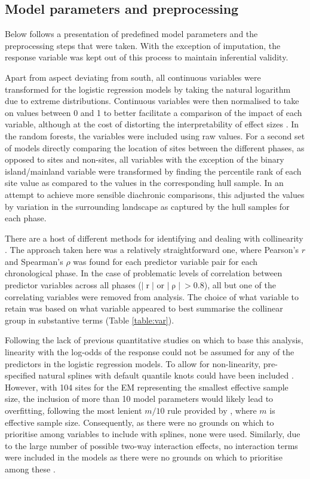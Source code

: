 \documentclass[12pt, a4paper]{article}
\begin{document}
\subsection{Model parameters and preprocessing}
Below follows a presentation of predefined model parameters and the preprocessing steps that were taken. With the exception of imputation, the response variable was kept out of this process to maintain inferential validity.\par
Apart from aspect deviating from south, all continuous variables were transformed for the logistic regression models by taking the natural logarithm due to extreme distributions. Continuous variables were then normalised to take on values between 0 and 1 to better facilitate a comparison of the impact of each variable, although at the cost of distorting the interpretability of effect sizes \citep[cf.][]{spencer2018}. In the random forests, the variables were included using raw values. For a second set of models directly comparing the location of sites between the different phases, as opposed to sites and non-sites, all variables with the exception of the binary island/mainland variable were transformed by finding the percentile rank of each site value as compared to the values in the corresponding hull sample. In an attempt to achieve more sensible diachronic comparisons, this adjusted the values by variation in the surrounding landscape as captured by the hull samples for each phase.\par
There are a host of different methods for identifying and dealing with collinearity \citep[e.g.][]{dormann2012, tomaschek2018}. The approach taken here was a relatively straightforward one, where Pearson's $r$ and Spearman's $\rho$ was found for each predictor variable pair for each chronological phase. In the case of problematic levels of correlation between predictor variables across all phases ($ |\mathopen r \mathclose|$ or $ | \mathopen \rho \mathclose|  \: > 0.8 $), all but one of the correlating variables were removed from analysis. The choice of what variable to retain was based on what variable appeared to best summarise the collinear group in substantive terms (Table \ref{table:var}).\par 
Following the lack of previous quantitative studies on which to base this analysis, linearity with the log-odds of the response could not be assumed for any of the predictors in the logistic regression models. To allow for non-linearity, pre-specified natural splines with default quantile knots could have been included \cite[][26--28]{harrell2015}. However, with 104 sites for the EM representing the smallest effective sample size, the inclusion of more than 10 model parameters would likely lead to overfitting, following the most lenient $m/10$ rule provided by \citet[][72--73]{harrell2015}, where $m$ is effective sample size. Consequently, as there were no grounds on which to prioritise among variables to include with splines, none were used. Similarly, due to the large number of possible two-way interaction effects, no interaction terms were included in the models as there were no grounds on which to prioritise among these \citep[cf.][36--38]{harrell2015}.\par 
\end{document}
